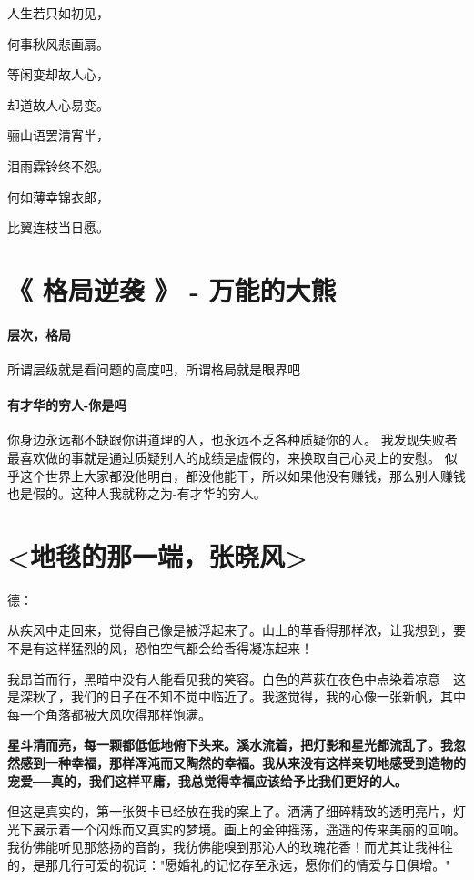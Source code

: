 \documentclass[UTF8,a4paper,8pt]{ctexbook}
\begin{document}
		 人生若只如初见，
		 
		 何事秋风悲画扇。
		 
		 等闲变却故人心，
		 
		 却道故人心易变。
		 
		 骊山语罢清宵半，
		 
		 泪雨霖铃终不怨。
		 
		 何如薄幸锦衣郎，
		 
		 比翼连枝当日愿。

		 \newpage
	 \section{《 格局逆袭 》 -  万能的大熊 } 
		 \paragraph{层次，格局}
			 所谓层级就是看问题的高度吧，所谓格局就是眼界吧
		 \paragraph{有才华的穷人-你是吗}
			 你身边永远都不缺跟你讲道理的人，也永远不乏各种质疑你的人。 我发现失败者最喜欢做的事就是通过质疑别人的成绩是虚假的，来换取自己心灵上的安慰。 似乎这个世界上大家都没他明白，都没他能干，所以如果他没有赚钱，那么别人赚钱也是假的。这种人我就称之为-有才华的穷人。
	
	  	 \newpage
	 \section{<地毯的那一端，张晓风>}
		德：
		
		从疾风中走回来，觉得自己像是被浮起来了。山上的草香得那样浓，让我想到，要不是有这样猛烈的风，恐怕空气都会给香得凝冻起来！
		
		我昂首而行，黑暗中没有人能看见我的笑容。白色的芦荻在夜色中点染着凉意－这是深秋了，我们的日子在不知不觉中临近了。我遂觉得，我的心像一张新帆，其中每一个角落都被大风吹得那样饱满。
		
		\textbf{星斗清而亮，每一颗都低低地俯下头来。溪水流着，把灯影和星光都流乱了。我忽然感到一种幸福，那样浑沌而又陶然的幸福。我从来没有这样亲切地感受到造物的宠爱──真的，我们这样平庸，我总觉得幸福应该给予比我们更好的人。}
		
		但这是真实的，第一张贺卡已经放在我的案上了。洒满了细碎精致的透明亮片，灯光下展示着一个闪烁而又真实的梦境。画上的金钟摇荡，遥遥的传来美丽的回响。我彷佛能听见那悠扬的音韵，我彷佛能嗅到那沁人的玫瑰花香！而尤其让我神往的，是那几行可爱的祝词："愿婚礼的记忆存至永远，愿你们的情爱与日俱增。"
		
\end{document}
